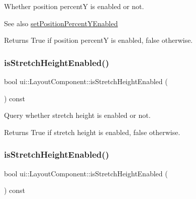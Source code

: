 Whether position percentY is enabled or not. \begin{DoxySeeAlso}{See also}
{\ttfamily \hyperlink{classui_1_1LayoutComponent_a820438ea0ef37dd3570ef21d9a3392ab}{set\+Position\+Percent\+Y\+Enabled}} 
\end{DoxySeeAlso}
\begin{DoxyReturn}{Returns}
True if position percentY is enabled, false otherwise. 
\end{DoxyReturn}
\mbox{\label{classui_1_1LayoutComponent_ac380d08f28b0816cc1f2b4bc24be4123}} 
\subsubsection{\texorpdfstring{is\+Stretch\+Height\+Enabled()}{isStretchHeightEnabled()}\hspace{0.1cm}{\footnotesize\ttfamily [1/2]}}
{\footnotesize\ttfamily bool ui\+::\+Layout\+Component\+::is\+Stretch\+Height\+Enabled (\begin{DoxyParamCaption}{ }\end{DoxyParamCaption}) const}

Query whether stretch height is enabled or not. \begin{DoxyReturn}{Returns}
True if stretch height is enabled, false otherwise. 
\end{DoxyReturn}
\mbox{\label{classui_1_1LayoutComponent_ac380d08f28b0816cc1f2b4bc24be4123}} 
\subsubsection{\texorpdfstring{is\+Stretch\+Height\+Enabled()}{isStretchHeightEnabled()}\hspace{0.1cm}{\footnotesize\ttfamily [2/2]}}
{\footnotesize\ttfamily bool ui\+::\+Layout\+Component\+::is\+Stretch\+Height\+Enabled (\begin{DoxyParamCaption}{ }\end{DoxyParamCaption}) const}

